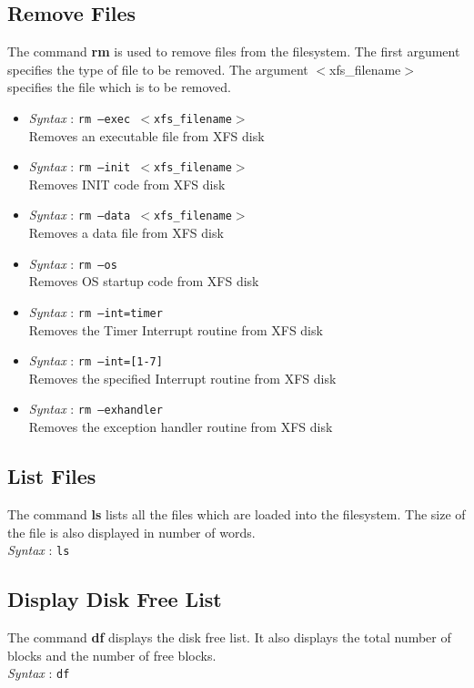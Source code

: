 \documentclass[11pt]{report}
\begin{document}
\subsection{Remove Files}
The command \textbf{rm} is used to remove files from the filesystem. The first argument specifies the type of file to be removed. The argument $<$xfs\_filename$>$ specifies the file which is to be removed.
\begin{itemize}
	\item \textit{Syntax} : \texttt{rm --exec $<$xfs\_filename$>$} \\
	 Removes an executable file from XFS disk 
	\item \textit{Syntax} : \texttt{rm --init  $<$xfs\_filename$>$ }\\
	 Removes INIT code from XFS disk 
	\item \textit{Syntax} : \texttt{rm --data	$<$xfs\_filename$>$}\\
	 Removes a data file from XFS disk 
	\item \textit{Syntax} : \texttt{rm --os} \\
	 Removes OS startup code from XFS disk 
	\item \textit{Syntax} : \texttt{rm --int=timer} \\
	 Removes the Timer Interrupt routine from XFS disk 
	\item \textit{Syntax} : \texttt{rm --int=[1-7] }\\
	 Removes the specified Interrupt routine from XFS disk 
	\item \textit{Syntax} : \texttt{rm --exhandler}\\
	 Removes the exception handler routine from XFS disk 
	
\end{itemize}
 
 
\subsection{List Files}
The command \textbf{ls} lists all the files which are loaded into the filesystem. The size of the file is also displayed in number of words.\\
\textit{Syntax} : \texttt{ls}

\subsection{Display Disk Free List}
The command \textbf{df} displays the disk free list. It also displays the total number of blocks and the number of free blocks.\\
\textit{Syntax} : \texttt{df}
\end{document}
